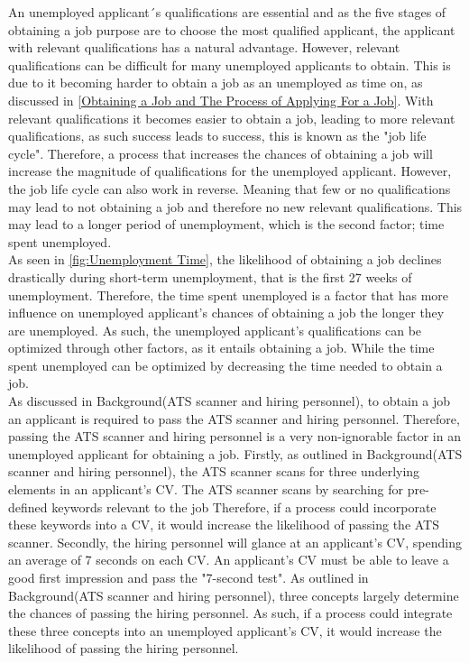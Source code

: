An unemployed applicant´s qualifications are essential and as the five stages of obtaining a job purpose are to choose the most qualified applicant, the applicant with relevant qualifications has a natural advantage.
However, relevant qualifications can be difficult for many unemployed applicants to obtain.
This is due to it becoming harder to obtain a job as an unemployed as time on, as discussed in \ref{Obtaining a Job and The Process of Applying For a Job}.
With relevant qualifications it becomes easier to obtain a job, leading to more relevant qualifications, as such success leads to success, this is known as the "job life cycle".\cite{Job_Cycle}
Therefore, a process that increases the chances of obtaining a job will increase the magnitude of qualifications for the unemployed applicant.
However, the job life cycle can also work in reverse.
Meaning that few or no qualifications may lead to not obtaining a job and therefore no new relevant qualifications.
This may lead to a longer period of unemployment, which is the second factor; time spent unemployed. \\

As seen in \ref{fig:Unemployment Time}, the likelihood of obtaining a job declines drastically during short-term unemployment, that is the first 27 weeks of unemployment.
Therefore, the time spent unemployed is a factor that has more influence on unemployed applicant's chances of obtaining a job the longer they are unemployed.
As such, the unemployed applicant's qualifications can be optimized through other factors, as it entails obtaining a job.
While the time spent unemployed can be optimized by decreasing the time needed to obtain a job. \\

As discussed in Background(ATS scanner and hiring personnel), to obtain a job an applicant is required to pass the ATS scanner and hiring personnel.
Therefore, passing the ATS scanner and hiring personnel is a very non-ignorable factor in an unemployed applicant for obtaining a job.
Firstly, as outlined in Background(ATS scanner and hiring personnel), the ATS scanner scans for three underlying elements in an applicant's CV.
The ATS scanner scans by searching for pre-defined keywords relevant to the job
Therefore, if a process could incorporate these keywords into a CV, it would increase the likelihood of passing the ATS scanner.
Secondly, the hiring personnel will glance at an applicant's CV, spending an average of 7 seconds on each CV.
An applicant's CV must be able to leave a good first impression and pass the "7-second test".
As outlined in Background(ATS scanner and hiring personnel), three concepts largely determine the chances of passing the hiring personnel.
As such, if a process could integrate these three concepts into an unemployed applicant's CV, it would increase the likelihood of passing the hiring personnel. \\

